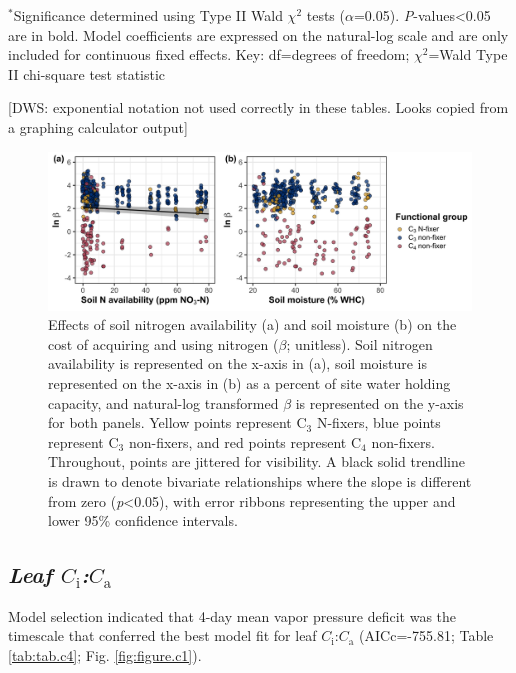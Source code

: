 \begin{singlespace}
    \noindent $^*$Significance determined using Type II Wald $\chi^{2}$ tests ($\alpha$=0.05). \textit{P}-values<0.05 are in bold. Model coefficients are expressed on the natural-log scale and are only included for continuous fixed effects. Key: df=degrees of freedom; $\chi^2$=Wald Type II chi-square test statistic
\end{singlespace}
\clearpage

[DWS: exponential notation not used correctly in these tables. Looks copied from a graphing calculator output]


\newpage
\begin{landscape}
    \begin{figure}
    \centering
    \includegraphics[scale = 0.075]{ch4_TXeco/figs/TXeco_fig2_beta.png}
    \caption[Effects of soil nitrogen availability and soil moisture on the cost of acquiring and using nitrogen]{Effects of soil nitrogen availability (a) and soil moisture (b) on the cost of acquiring and using nitrogen ($\beta$; unitless). Soil nitrogen availability is represented on the x-axis in (a), soil moisture is represented on the x-axis in (b) as a percent of site water holding capacity, and natural-log transformed $\beta$ is represented on the y-axis for both panels. Yellow points represent C$_3$ N-fixers, blue points represent C$_3$ non-fixers, and red points represent C$_4$ non-fixers. Throughout, points are jittered for visibility. A black solid trendline is drawn to denote bivariate relationships where the slope is different from zero (\textit{p}<0.05), with error ribbons representing the upper and lower 95\% confidence intervals.}
    \label{fig:figure4.2}
\end{figure}
\end{landscape}
\clearpage

\subsection{\textit{Leaf $C_\mathrm{i}$:$C_\mathrm{a}$}}
\noindent Model selection indicated that 4-day mean vapor pressure deficit was the timescale that conferred the best model fit for leaf $C_\mathrm{i}$:$C_\mathrm{a}$ (AICc=-755.81; Table \ref{tab:tab.c4}; Fig. \ref{fig:figure.c1}).

